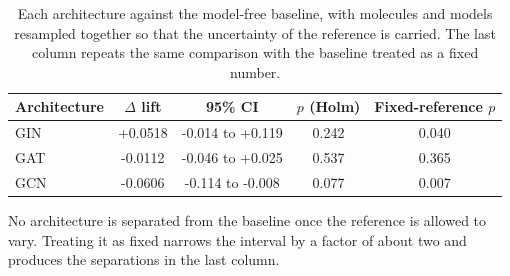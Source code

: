 \begin{table}[htbp]
\centering
\caption{Each architecture against the model-free baseline, with molecules and models resampled together so that the uncertainty of the reference is carried. The last column repeats the same comparison with the baseline treated as a fixed number.}
\label{tab:paired}
\small
\setlength{\tabcolsep}{4pt}
\begin{tabular}{lcccc}
\toprule
Architecture & $\Delta$ lift & 95\% CI & $p$ (Holm) & Fixed-reference $p$ \\
\midrule
GIN & +0.0518 & -0.014 to +0.119 & 0.242 & 0.040 \\
GAT & -0.0112 & -0.046 to +0.025 & 0.537 & 0.365 \\
GCN & -0.0606 & -0.114 to -0.008 & 0.077 & 0.007 \\
\bottomrule
\end{tabular}
\begin{flushleft}\footnotesize No architecture is separated from the baseline once the reference is allowed to vary. Treating it as fixed narrows the interval by a factor of about two and produces the separations in the last column.\end{flushleft}
\end{table}
